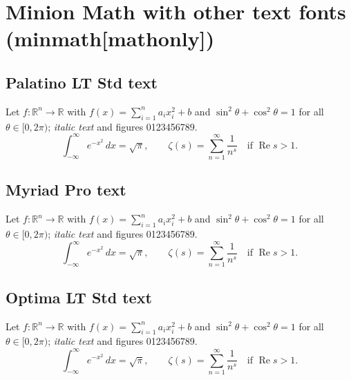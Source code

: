 \documentclass[11pt]{article}
\newcommand{\sample}{Let $f\colon \mathbb{R}^n \to \mathbb{R}$ with
  $f(x) = \sum_{i=1}^{n} a_i x_i^2 + b$ and $\sin^2\theta + \cos^2\theta = 1$
  for all $\theta\in[0,2\pi)$; \textit{italic text} and figures 0123456789.
  \[ \int_{-\infty}^{\infty} e^{-x^2}\,dx = \sqrt{\pi}, \qquad
     \zeta(s) = \sum_{n=1}^{\infty} \frac{1}{n^s}
     \quad\text{if } \operatorname{Re} s > 1. \]}
\begin{document}
\section*{Minion Math with other text fonts (minmath[mathonly])}

\subsection*{Palatino LT Std text}
\sample

\subsection*{\sffamily Myriad Pro text}
{\sffamily \sample}

\subsection*{\optimafamily Optima LT Std text}
{\optimafamily \sample}
\end{document}

